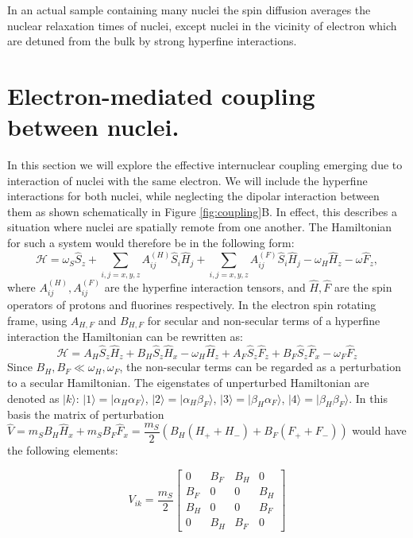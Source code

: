 \documentclass[a4paper, 12pt]{article}
\begin{document}
 In an actual sample containing many nuclei the spin diffusion averages the nuclear relaxation times of nuclei, except nuclei in the vicinity of electron which are detuned from the bulk by strong hyperfine interactions.



\section{Electron-mediated coupling between nuclei.}
In this section we will explore the effective internuclear coupling emerging due to interaction of nuclei with the same electron.
We will include the hyperfine interactions for both nuclei, while neglecting the dipolar interaction between them as shown schematically in Figure \ref{fig:coupling}B. In effect, this describes a situation where nuclei are spatially remote from one another. The Hamiltonian for such a system would therefore be in the following form:
\begin{equation}
\mathcal{H} =  \omega_S \hat{S}_z + \sum_{i,j=x,y,z} A_{ij}^{(H)} \hat{S}_i \hat{H}_j +  \sum_{i,j=x,y,z} A_{ij}^{(F)} \hat{S}_i \hat{H}_j - \omega_H \hat{H}_z - \omega \hat{F}_z ,
\end{equation}
where $A_{ij}^{(H)}, A_{ij}^{(F)}$ are the hyperfine interaction tensors, and $\hat{H}, \hat{F}$ are the spin operators of protons and fluorines respectively. In the electron spin rotating frame, using $A_{H,F}$ and $B_{H,F}$ for secular and non-secular terms of a hyperfine interaction the Hamiltonian can be rewritten as:
\begin{equation}
\mathcal{H}  = A_H \hat{S}_z \hat{H}_z + B_H \hat{S}_z \hat{H}_x -  \omega_H \hat{H}_z + A_F \hat{S}_z \hat{F}_z + B_F \hat{S}_z \hat{F}_x - \omega_F \hat{F}_z
\end{equation}
Since $B_H, B_F \ll \omega_H, \omega_F $, the non-secular terms can be regarded as a perturbation to a secular Hamiltonian.
The eigenstates of unperturbed Hamiltonian are denoted as $\vert k \rangle  $: $\vert 1 \rangle = \vert \alpha_H \alpha_F \rangle$, $\vert 2 \rangle =   \vert \alpha_H \beta_F \rangle$, $\vert 3 \rangle =   \vert \beta_H \alpha_F \rangle$, $\vert 4 \rangle =   \vert \beta_H \beta_F \rangle$. In this basis the matrix of perturbation $\hat{V} = m_S B_H \hat{H}_x + m_S B_F \hat{F}_x =\dfrac{m_S}{2} ( B_H (H_{+} + H_{-})  + B_F (F_{+} + F_{-})) $ would have the following elements:

\begin{equation}
	V_{ik} = \dfrac{m_S}{2} \begin{bmatrix}
	0 & B_F & B_H & 0 \\
	B_F & 0 & 0 & B_H \\
	B_H & 0 & 0 & B_F \\
	0 & B_H & B_F & 0 
	\end{bmatrix}
\end{equation}
\end{document}
